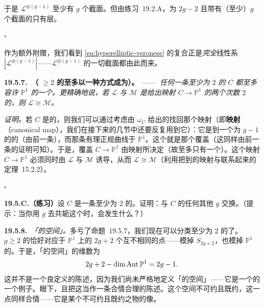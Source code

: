 于是 $\mathscr{L}^{\otimes(g-1)}$ 至少有 $g$ 个截面。但由\mbox{练习~19.2.A}，\trDegree{}为 $2g-2$ 且带有（至少）$g$ 个截面的\trInvertibleSheaf{}只有\trCanonical{}层。

\begin{flushright}
$\square$
\end{flushright}

作为额外附赠，我们看到 \eqref{eq:hyperelliptic-veronese} 的复合正是\emph{完全}线性系 $|\mathscr{L}^{\otimes(g-1)}|$——$\mathscr{L}^{\otimes(g-1)}$ 的一切截面都由此而来。

\textbf{19.5.7.\ \trhProposition（\trGenus{} $\ge 2$ 的\trCurve{}至多以一种方式成为\trHyperelliptic）。}\ ——\ \emph{任何一条\trGenus{}至少为 $2$ 的\trCurve{} $C$ 都至多容许 $\mathbb{P}^1$ 的一个\trDoubleCover。更精确地说，若 $\mathscr{L}$ 与 $\mathscr{M}$ 是给出映射 $C\to\mathbb{P}^1$ 的两个次数 $2$ 的\trLineBundle，则 $\mathscr{L}\cong\mathscr{M}$。}

\emph{证明。}\quad 若 $C$ 是\trHyperelliptic{}的，则我们可以通过考虑由 $\omega_C$ 给出的\trCanonical\trLinearSystem{}找回那个\trHyperelliptic{}映射（即\textbf{\trCanonical{}映射}（canonical map），我们在接下来的几节中还要反复用到它）：它是到一个\trDegree{}为 $g-1$ 的\trRationalNormalCurve{}的\trDoubleCover（由前一条\trhProposition），而那条有理正规曲线\trIsomorphic{}于 $\mathbb{P}^1$。这个\trDoubleCover{}就是那个\trHyperelliptic{}覆盖（这同样由前一条\trhProposition{}的证明可知）。于是，\trHyperelliptic{}覆盖 $C\to\mathbb{P}^1$ 由\trCanonical{}映射所决定（故至多只有一个）。这个映射 $C\to\mathbb{P}^1$ 必须同时由 $\mathscr{L}$ 与 $\mathscr{M}$ 诱导，从而 $\mathscr{L}\cong\mathscr{M}$（利用把到\trProjectiveSpace{}的映射与\trLineBundle{}联系起来的\mbox{定理~15.2.2}）。

\begin{flushright}
$\square$
\end{flushright}

\textbf{19.5.C.（练习）}\quad 设 $C$ 是一条\trGenus{}至少为 $2$ 的\trHyperelliptic\trCurve。证明：\trHyperelliptic{}\trInvolution{}与 $C$ 的任何其他\trAutomorphism{} $g$ 交换。（提示：当你用 $g$ 去共轭这个\trInvolution{}时，会发生什么？）

\textbf{19.5.8.}\ \emph{「\trHyperelliptic\trCurve{}的空间」。}\quad 多亏了\mbox{命题~19.5.7}，我们现在可以分类\trGenus{}至少为 $2$ 的\trHyperelliptic\trCurve{}了。\trGenus{} $g\ge 2$ 的\trHyperelliptic\trCurve{}恰好对应于 $\mathbb{P}^1$ 上的 $2g+2$ 个互不相同的点——模掉 $S_{2g+2}$，也模掉 $\mathbb{P}^1$ 的\trAutomorphism。于是，「\trHyperelliptic\trCurve{}的空间」的维数为
\[
2g+2-\dim\operatorname{Aut}\mathbb{P}^1=2g-1.
\]
这并不是一个良定义的陈述，因为我们尚未严格地定义「\trHyperelliptic\trCurve{}的空间」——它是一个\trModuliSpace{}的一个例子。眼下，且把这当作一条合情合理的陈述。这个空间不可约且既约，这一点同样合情——它是某个不可约且既约之物的像。
